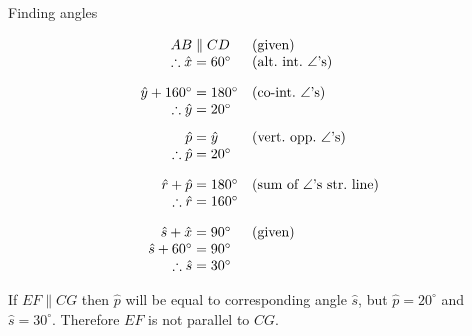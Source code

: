 \begin{wex}{Finding angles}
{\begin{center}
{}
 \end{center}
} 
{

\begin{equation*}
  \begin{array}{r@{\;}l@{\quad}l}
    AB  &\parallel CD & \mbox{(given)} \\
    \therefore \hat{x} &=60^{\circ}   & \mbox{(alt.\ int.\ $\angle$'s)}  \vspace{10pt} \\
    \hat{y} + 160^\circ &= 180^{\circ} & \mbox{(co-int.\ $\angle$'s)} \\
    \therefore \hat{y} &= 20^{\circ}  & \vspace{8pt}\\
    \hat{p} &= \hat{y}    & \mbox{(vert.\ opp.\ $\angle$'s)} \\
    \therefore \hat{p} &= 20^{\circ}  &  \vspace{10pt}\\
    \hat{r} + \hat{p} &= 180^{\circ} &\mbox{(sum of $\angle$'s str.\ line)} \\
    \therefore \hat{r} &= 160^{\circ} &  \vspace{10pt}\\
    \hat{s} + \hat{x} &= 90^{\circ}  & \mbox{(given)} \\ 
    \hat{s} + 60^\circ &= 90^{\circ} & \\
    \therefore \hat{s} &= 30^{\circ} &  
  \end{array}
\end{equation*} 

If $EF \parallel CG$ then $\hat{p}$ will be equal to corresponding
angle $\hat{s}$, but $\hat{p} = 20^{\circ}$ and $\hat{s} = 30^{\circ}$.
Therefore $EF$ is not parallel to $CG$.
}
\end{wex}


